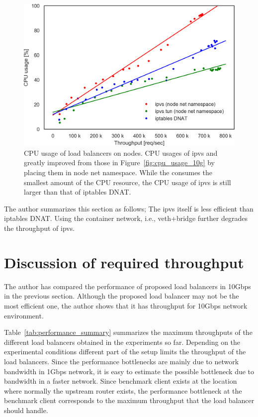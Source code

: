\begin{figure}[h]
  \centering
  \includegraphics[width=0.8\columnwidth]{Figs/cpu_usage_10g_node_ns}
  \par\bigskip
  \centering
  \begin{minipage}{0.9\columnwidth}
    \caption[CPU usage of load balancers on nodes]{
      CPU usage of load balancers on nodes.
      CPU usages of ipvs and  greatly improved from those in Figure~\ref{fig:cpu_usage_10g} by placing them in node net namespace.  
      While the  consumes the smallest amount of the CPU resource, the CPU usage of ipvs is still larger than that of iptables DNAT.
    }
    \label{fig:cpu_usage_10g_node_ns}
  \end{minipage}
\end{figure}

The author summarizes this section as follows;
The ipvs itself is less efficient than iptables DNAT.
Using the container network, i.e., veth+bridge further degrades the throughput of ipvs.

\FloatBarrier

\section{Discussion of required throughput}

The author has compared the performance of proposed load balancers in 10Gbps in the previous section.
Although the proposed load balancer may not be the most efficient one, the author shows that it has  throughput for 10Gbps network environment.

Table~\ref{tab:performance_summary} summarizes the maximum throughputs of the different load balancers obtained in the experiments so far.
Depending on the experimental conditions different part of the  setup limits the throughput of the load balancers.
Since the performance bottlenecks are mainly due to network bandwidth in 1Gbps network, it is easy to estimate the possible bottleneck due to bandwidth in a faster network.
Since benchmark client exists at the location where normally the upstream router exists, the performance bottleneck at the benchmark client corresponds to the maximum throughput that the load balancer should handle.


